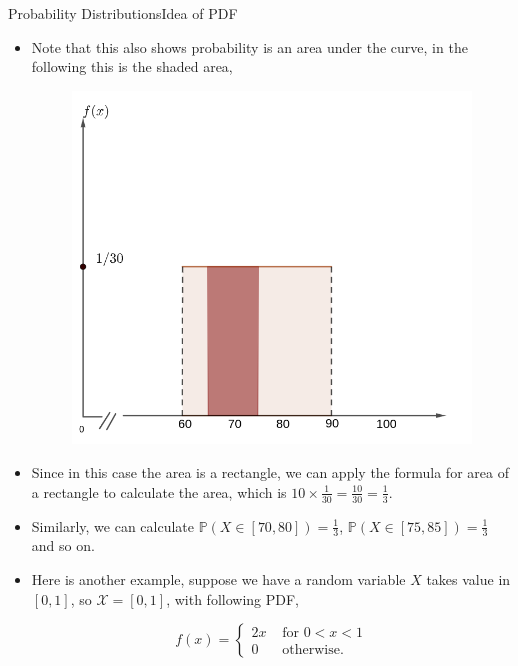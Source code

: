 \documentclass[8pt, usepdftitle=false]{beamer}
\begin{document}
\begin{frame}[allowframebreaks]{Probability Distributions}{Idea of PDF}
\begin{itemize}
\item Note that this also shows probability is an area under the curve, in the following this is the shaded area,

\begin{figure}
 	\includegraphics[scale = .2]{Images/Cont_Uniform_area.png}
 \end{figure} 

\item Since in this case the area is a rectangle, we can apply the formula for area of a rectangle to calculate the area, which is $10 \times \frac{1}{30} = \frac{10}{30} = \frac{1}{3}$.


\item Similarly, we can calculate $\mathbb{P}(X \in [70, 80]) = \frac{1}{3}$, $\mathbb{P}(X \in [75, 85]) = \frac{1}{3}$ and so on.


\framebreak

\item Here is another example, suppose we have a random variable $X$ takes value in $[0, 1]$, so $\mathcal{X} = [0, 1]$, with following PDF,

$$
f(x)= \begin{cases}2 x & \text { for } 0<x<1 \\ 0 & \text { otherwise. }\end{cases}
$$


\end{itemize}
\end{frame}
\end{document}
